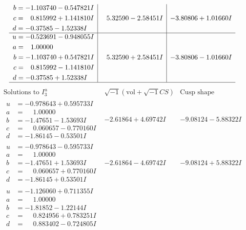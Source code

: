 \documentclass[1p]{elsarticle_modified}
\theoremstyle{definition}
\newcommand{\I}{\sqrt{-1}}
\begin{document}
$$\begin{array}{c|c|c}
\begin{aligned}
b &= -1.103740 - 0.547821 I \\
c &= \phantom{-}0.815992 + 1.141810 I \\
d &= -0.37585 - 1.52338 I\end{aligned}
 & \phantom{-}5.32590 - 2.58451 I & -3.80806 + 1.01660 I \\ \hline\begin{aligned}
u &= -0.523691 - 0.948055 I \\
a &= \phantom{-}1.00000\phantom{ +0.000000I} \\
b &= -1.103740 + 0.547821 I \\
c &= \phantom{-}0.815992 - 1.141810 I \\
d &= -0.37585 + 1.52338 I\end{aligned}
 & \phantom{-}5.32590 + 2.58451 I & -3.80806 - 1.01660 I\\
 \hline 
 \end{array}$$\newpage$$\begin{array}{c|c|c}  
\text{Solutions to }I^u_{3}& \I (\text{vol} + \sqrt{-1}CS) & \text{Cusp shape}\\
 \hline 
\begin{aligned}
u &= -0.978643 + 0.595733 I \\
a &= \phantom{-}1.00000\phantom{ +0.000000I} \\
b &= -1.47651 - 1.53693 I \\
c &= \phantom{-}0.060657 - 0.770160 I \\
d &= -1.86145 - 0.53501 I\end{aligned}
 & -2.61864 + 4.69742 I & -9.08124 - 5.88322 I \\ \hline\begin{aligned}
u &= -0.978643 - 0.595733 I \\
a &= \phantom{-}1.00000\phantom{ +0.000000I} \\
b &= -1.47651 + 1.53693 I \\
c &= \phantom{-}0.060657 + 0.770160 I \\
d &= -1.86145 + 0.53501 I\end{aligned}
 & -2.61864 - 4.69742 I & -9.08124 + 5.88322 I \\ \hline\begin{aligned}
u &= -1.126060 + 0.711355 I \\
a &= \phantom{-}1.00000\phantom{ +0.000000I} \\
b &= -1.81852 - 1.22144 I \\
c &= \phantom{-}0.824956 + 0.783251 I \\
d &= \phantom{-}0.883402 - 0.724805 I\end{aligned}

\end{array}$$
\end{document}
